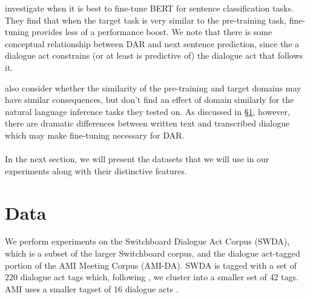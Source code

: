 \documentclass[11pt,a4paper]{article}
\begin{document}
\citet{petersTuneNotTune2019} investigate when it is best to fine-tune BERT for sentence classification tasks.
They find that when the target task is very similar to the pre-training task, fine-tuning provides less of a performance boost.
We note that there is some conceptual relationship between DAR and next sentence prediction, since the a dialogue act constrains (or at least is predictive of) the dialogue act that follows it.

\citet{petersTuneNotTune2019} also consider whether the similarity of the pre-training and target domains may have similar consequences, but don't find an effect of domain similarly for the natural language inference tasks they tested on.
As discussed in \S\ref{sec:data}, however, there are dramatic differences between written text and transcribed dialogue which may make fine-tuning necessary for DAR.

\paragraph{} In the next section, we will present the datasets that we will use in our experiments along with their distinctive features.

\section{Data}\label{sec:data}
We perform experiments on the Switchboard Dialogue Act Corpus (SWDA), which is a subset of the larger Switchboard corpus, and the dialogue act-tagged portion of the AMI Meeting Corpus (AMI-DA). 
SWDA is tagged with a set of 220 dialogue act tags which, following  \citet{jurafskySwitchboardSWBDDAMSLShallowDiscourseFunction1997a}, we cluster into a smaller set of 42 tags.
AMI uses a smaller tagset of 16 dialogue acts \citep{GuidelinesDialogueAct2005}.

\end{document}
